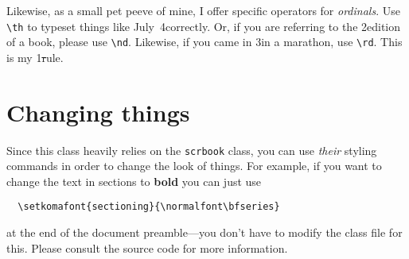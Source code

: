 Likewise, as a small pet peeve of mine, I offer specific operators for \emph{ordinals}. Use \verb|\th| to typeset things like July~4\th correctly. Or, if you are referring to the 2\nd edition of a book, please use \verb|\nd|. Likewise, if you came in 3\rd in a marathon, use \verb|\rd|. This is my 1\st rule.

\section{Changing things}

Since this class heavily relies on the \verb|scrbook| class, you can use
\emph{their} styling commands in order to change the look of things. For
example, if you want to change the text in sections to \textbf{bold} you
can just use
%
\begin{verbatim}
  \setkomafont{sectioning}{\normalfont\bfseries}
\end{verbatim}
%
at the end of the document preamble---you don't have to modify the class
file for this. Please consult the source code for more information.
